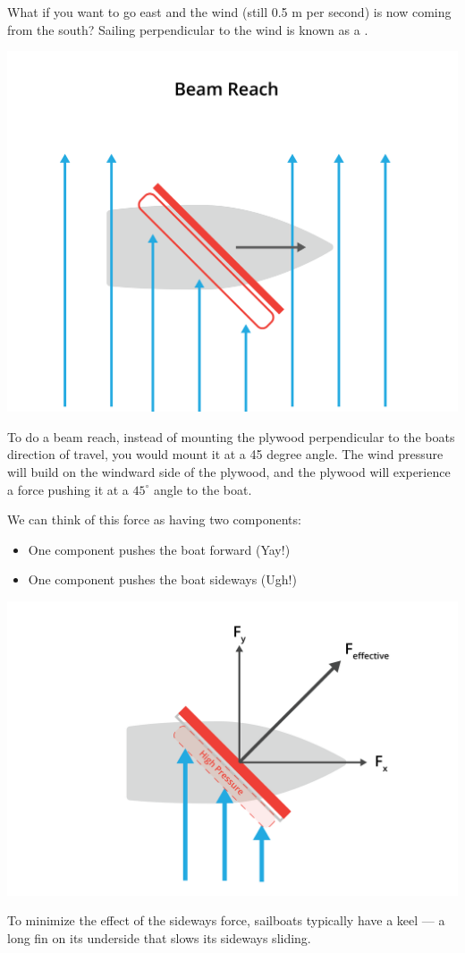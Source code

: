 What if you want to go east and the wind (still 0.5 m per second) is now coming from the south?  Sailing perpendicular to the wind is known as a .

\includegraphics[width=.75\textwidth]{beamReach.png}


To do a beam reach,  instead of mounting the plywood perpendicular to the boats direction of travel,  you would mount it at a 45 degree angle. The wind pressure will build on the windward
side of the plywood,  and the plywood will experience a force pushing it at a $45^\circ$ angle to the boat.

We can think of this force as having two components: 
\begin{itemize}
\item One component pushes the boat forward (Yay!)
\item One component pushes the boat sideways (Ugh!)
\end{itemize}
\includegraphics[width=.75\textwidth]{pressure.png}

To minimize the effect of the sideways force,  sailboats typically have  a keel --- a long fin on its underside that slows its sideways sliding.

